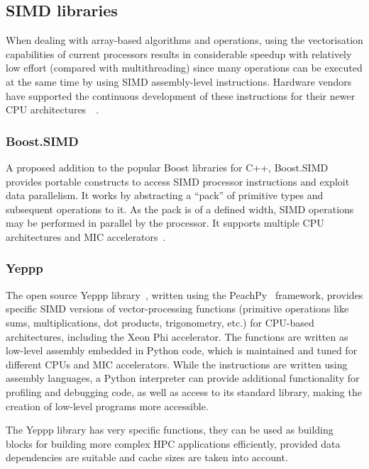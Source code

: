 \subsection{SIMD libraries}

When dealing with array-based algorithms and operations, using the \gls{vectorisation} capabilities of current processors results in considerable speedup with relatively low effort (compared with multithreading) since many operations can be executed at the same time by using SIMD assembly-level instructions. Hardware vendors have supported the continuous development of these instructions for their newer CPU architectures~\cite{lomont2011introduction}~\cite{4_arm.com_2015}.

\subsubsection{Boost.SIMD}

A proposed addition to the popular Boost libraries for C++, Boost.SIMD~\cite{esterie2014boost} provides portable constructs to access SIMD processor instructions and exploit data parallelism. It works by abstracting a ``pack'' of primitive types and subsequent operations to it. As the pack is of a defined width, SIMD operations may be performed in parallel by the processor. It supports multiple CPU architectures and MIC accelerators~\cite{1_numscale.com_2014}.

\subsubsection{Yeppp}

The open source Yeppp library~\cite{4_yeppp.info_2015}, written using the PeachPy~\cite{dukhan2013peachpy} framework, provides specific SIMD versions of vector-processing functions (primitive operations like sums, multiplications, dot products, trigonometry, etc.) for CPU-based architectures, including the Xeon Phi accelerator. The functions are written as low-level assembly embedded in Python code, which is maintained and tuned for different CPUs and MIC accelerators. While the instructions are written using assembly languages, a Python interpreter can provide additional functionality for profiling and debugging code, as well as access to its standard library, making the creation of low-level programs more accessible.

The Yeppp library has very specific functions, they can be used as building blocks for building more complex HPC applications efficiently, provided data dependencies are suitable and cache sizes are taken into account.

